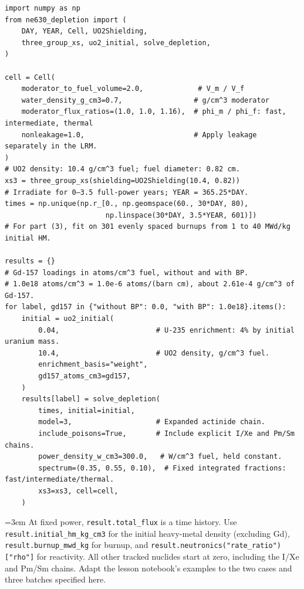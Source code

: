 \begin{Verbatim}[fontsize=\footnotesize,breaklines=true]
import numpy as np
from ne630_depletion import (
    DAY, YEAR, Cell, UO2Shielding,
    three_group_xs, uo2_initial, solve_depletion,
)

cell = Cell(
    moderator_to_fuel_volume=2.0,             # V_m / V_f
    water_density_g_cm3=0.7,                 # g/cm^3 moderator
    moderator_flux_ratios=(1.0, 1.0, 1.16),  # phi_m / phi_f: fast, intermediate, thermal
    nonleakage=1.0,                          # Apply leakage separately in the LRM.
)
# UO2 density: 10.4 g/cm^3 fuel; fuel diameter: 0.82 cm.
xs3 = three_group_xs(shielding=UO2Shielding(10.4, 0.82))
# Irradiate for 0–3.5 full-power years; YEAR = 365.25*DAY.
times = np.unique(np.r_[0., np.geomspace(60., 30*DAY, 80),
                        np.linspace(30*DAY, 3.5*YEAR, 601)])
# For part (3), fit on 301 evenly spaced burnups from 1 to 40 MWd/kg initial HM.

results = {}
# Gd-157 loadings in atoms/cm^3 fuel, without and with BP.
# 1.0e18 atoms/cm^3 = 1.0e-6 atoms/(barn cm), about 2.61e-4 g/cm^3 of Gd-157.
for label, gd157 in {"without BP": 0.0, "with BP": 1.0e18}.items():
    initial = uo2_initial(
        0.04,                       # U-235 enrichment: 4% by initial uranium mass.
        10.4,                       # UO2 density, g/cm^3 fuel.
        enrichment_basis="weight",
        gd157_atoms_cm3=gd157,
    )
    results[label] = solve_depletion(
        times, initial=initial,
        model=3,                    # Expanded actinide chain.
        include_poisons=True,       # Include explicit I/Xe and Pm/Sm chains.
        power_density_w_cm3=300.0,   # W/cm^3 fuel, held constant.
        spectrum=(0.35, 0.55, 0.10),  # Fixed integrated fractions: fast/intermediate/thermal.
        xs3=xs3, cell=cell,
    )
\end{Verbatim}

\begingroup\emergencystretch=3em
At fixed power, \texttt{result.\allowbreak{}total\_\allowbreak{}flux} is a time history. Use \texttt{result.\allowbreak{}initial\_\allowbreak{}hm\_\allowbreak{}kg\_\allowbreak{}cm3} for the initial heavy-metal density (excluding Gd), \texttt{result.\allowbreak{}burnup\_\allowbreak{}mwd\_\allowbreak{}kg} for burnup, and \texttt{result.\allowbreak{}neutronics("rate\_\allowbreak{}ratio"){[}"rho"{]}} for reactivity. All other tracked nuclides start at zero, including the I/Xe and Pm/Sm chains. Adapt the lesson notebook's examples to the two cases and three batches specified here.
\par\endgroup

